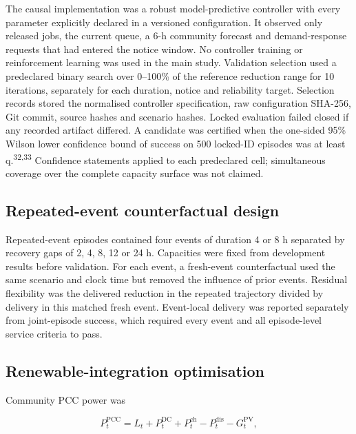 \documentclass[10pt,a4paper]{article}
\begin{document}
The causal implementation was a robust model-predictive controller with every parameter explicitly declared in a versioned configuration. It observed only released jobs, the current queue, a 6-h community forecast and demand-response requests that had entered the notice window. No controller training or reinforcement learning was used in the main study. Validation selection used a predeclared binary search over 0–100\% of the reference reduction range for 10 iterations, separately for each duration, notice and reliability target. Selection records stored the normalised controller specification, raw configuration SHA-256, Git commit, source hashes and scenario hashes. Locked evaluation failed closed if any recorded artifact differed. A candidate was certified when the one-sided 95\% Wilson lower confidence bound of success on 500 locked-ID episodes was at least q.\textsuperscript{32,33} Confidence statements applied to each predeclared cell; simultaneous coverage over the complete capacity surface was not claimed.


\subsection*{Repeated-event counterfactual design}

Repeated-event episodes contained four events of duration 4 or 8 h separated by recovery gaps of 2, 4, 8, 12 or 24 h. Capacities were fixed from development results before validation. For each event, a fresh-event counterfactual used the same scenario and clock time but removed the influence of prior events. Residual flexibility was the delivered reduction in the repeated trajectory divided by delivery in this matched fresh event. Event-local delivery was reported separately from joint-episode success, which required every event and all episode-level service criteria to pass.


\subsection*{Renewable-integration optimisation}

Community PCC power was


\begin{equation*}
P^{\mathrm{PCC}}_t=L_t+P^{\mathrm{DC}}_t+P^{\mathrm{ch}}_t-P^{\mathrm{dis}}_t-G^{\mathrm{PV}}_t,
\end{equation*}
\end{document}
